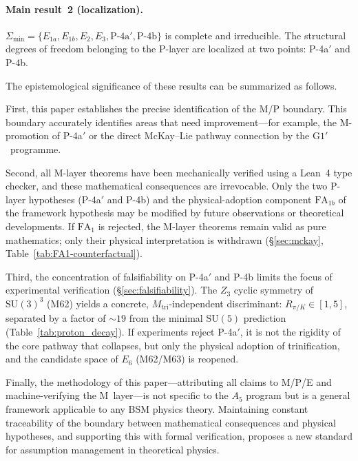 \documentclass[sn-mathphys-num,Numbered]{sn-jnl}
\theoremstyle{thmstyleone}
\theoremstyle{thmstylethree}
\newcommand{\Amin}{\Sigma_{\min}}
\newcommand{\SU}{\mathrm{SU}}
\begin{document}
\paragraph{Main result~2 (localization).}
$\Amin = \{E_{1a}, E_{1b}, E_2, E_3, \text{P-4a}', \text{P-4b}\}$ is
complete and irreducible.  The structural degrees of freedom belonging to the
P-layer are localized at two points: P-4a$'$ and P-4b.

The epistemological significance of these results can be summarized as follows.

First, this paper establishes the precise identification of the M/P boundary.
This boundary accurately identifies areas that need improvement---for example,
the M-promotion of P-4a$'$ or the direct McKay--Lie pathway connection by the
$\mathrm{G1}'$~programme.

Second, all M-layer theorems have been mechanically verified using a Lean~4
type checker, and these mathematical consequences are irrevocable.  Only the
two P-layer hypotheses (P-4a$'$ and P-4b) and the physical-adoption component
$\mathrm{FA}_{1b}$ of the framework hypothesis may be modified by future
observations or theoretical developments.  If $\mathrm{FA}_1$ is rejected,
the M-layer theorems remain valid as pure mathematics; only their physical
interpretation is withdrawn (\S\ref{sec:mckay},
Table~\ref{tab:FA1-counterfactual}).

Third, the concentration of falsifiability on P-4a$'$ and P-4b limits the
focus of experimental verification (\S\ref{sec:falsifiability}).  The $Z_3$
cyclic symmetry of $\SU(3)^3$ (M62) yields a concrete, $M_{\mathrm{tri}}$-independent
discriminant: $R_{\pi/K} \in [1,5]$, separated by a factor of $\sim 19$ from
the minimal $\SU(5)$ prediction (Table~\ref{tab:proton_decay}).  If
experiments reject P-4a$'$, it is not the rigidity of the core pathway that
collapses, but only the physical adoption of trinification, and the candidate
space of $E_6$ (M62/M63) is reopened.

Finally, the methodology of this paper---attributing all claims to M/P/E and
machine-verifying the M~layer---is not specific to the $A_5$ program but is a
general framework applicable to any BSM physics theory.  Maintaining constant
traceability of the boundary between mathematical consequences and physical
hypotheses, and supporting this with formal verification, proposes a new
standard for assumption management in theoretical physics.

\backmatter
\end{document}
